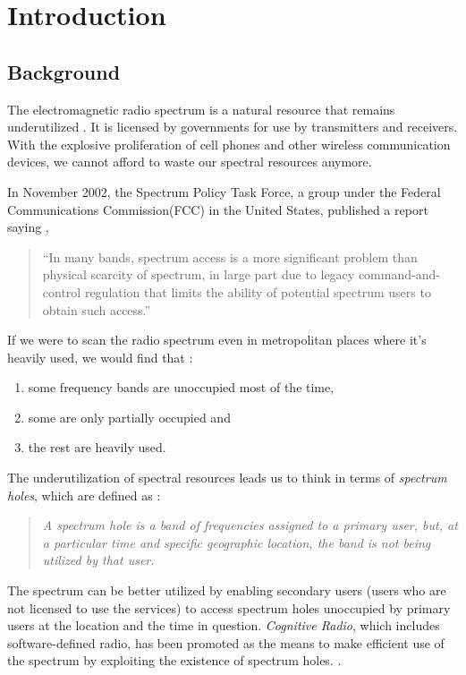 \chapter{Introduction}
\section{Background}
The electromagnetic radio spectrum is a natural resource that remains underutilized \cite{haykin05}. It is licensed by governments for use by transmitters and receivers. With the explosive proliferation of cell phones and other wireless communication devices, we cannot afford to waste our spectral resources anymore.

In November 2002, the Spectrum Policy Task Force, a group under the Federal Communications Commission(FCC) in the United States, published a report saying \cite{repFCC}, 
\begin{quote}
``In many bands, spectrum access is a more significant problem than physical scarcity of spectrum, in large part due to legacy command-and-control regulation that limits the ability of potential spectrum users to obtain such access.''
\end{quote}

If we were to scan the radio spectrum even in metropolitan places where it's heavily used, we would find that \cite{staple04} :
\begin{enumerate}
	\item some frequency bands are unoccupied most of the time,
	\item some are only partially occupied and
	\item the rest are heavily used.
\end{enumerate}

The underutilization of spectral resources leads us to think in terms of \emph{spectrum holes}, which are defined as \cite{kolodzy01}:
\begin{quote}
\emph{A spectrum hole is a band of frequencies assigned to a primary user, but, at a particular time and specific geographic location, the band is not being utilized by that user.
}
\end{quote}

The spectrum can be better utilized by enabling secondary users (users who are not licensed to use the services) to access spectrum holes unoccupied by primary users at the location and the time in question. \emph{Cognitive Radio}, which includes software-defined radio, has been promoted as the means to make efficient use of the spectrum by exploiting the existence of spectrum holes. \cite{haykin05}\cite{mitola99}\cite{mitola00}.

